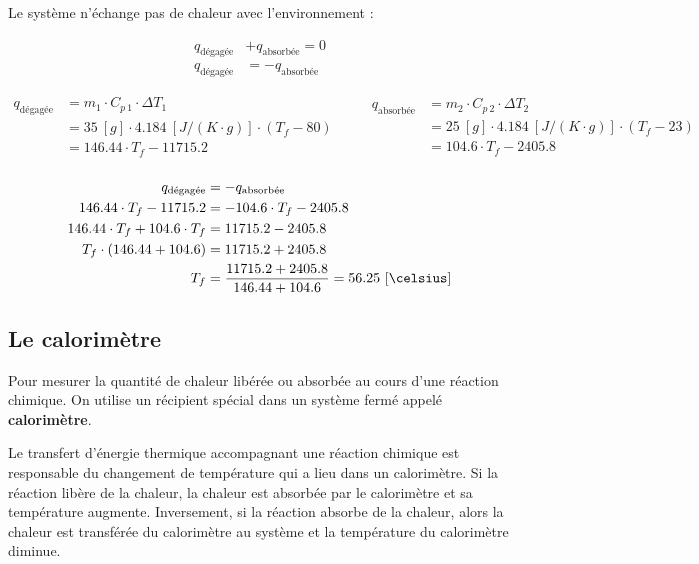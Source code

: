 \documentclass[
  11pt,
  a4paper,
  openany]{book}
\begin{document}
\begin{Answer}
Le système n'échange pas de chaleur avec l'environnement :

\[
\begin{split}
q_{\text{dégagée}} &+ q_{\text{absorbée}} = 0 \\
q_{\text{dégagée}} &= - q_{\text{absorbée}}
\end{split}
\]

\[
\begin{split}
q_{\text{dégagée}} &= m_1 \cdot C_{p\ 1} \cdot \Delta T_1 \\
  &= 35\ [g] \cdot 4.184\ [J/(K \cdot g)] \cdot (T_f - 80) \\
  &= 146.44 \cdot T_f - 11715.2 \\
\end{split}
\qquad
\begin{split}
q_{\text{absorbée}} &= m_2 \cdot C_{p\ 2} \cdot \Delta T_2 \\
  &= 25\ [g] \cdot 4.184\ [J/(K \cdot g)] \cdot (T_f - 23) \\
  &= 104.6 \cdot T_f - 2405.8 \\
\end{split}
\]

\[
\begin{split}
q_{\text{dégagée}} &= - q_{\text{absorbée}} \\
146.44 \cdot T_f - 11715.2 &= - 104.6 \cdot T_f - 2405.8 \\
146.44 \cdot T_f + 104.6 \cdot T_f &= 11715.2 - 2405.8 \\
T_f \cdot (146.44 + 104.6) &= 11715.2 + 2405.8 \\
T_f &= \frac{11715.2 + 2405.8}{146.44+104.6} = 56.25\ [\celsius]
\end{split}
\]

\end{Answer}

\hypertarget{le-calorimuxe8tre}{%
\subsection{Le calorimètre}\label{le-calorimuxe8tre}}

Pour mesurer la quantité de chaleur libérée ou absorbée au cours d'une réaction chimique. On utilise un récipient spécial dans un système fermé appelé \textbf{calorimètre}.

Le transfert d'énergie thermique accompagnant une réaction chimique est responsable du changement de température qui a lieu dans un calorimètre. Si la réaction libère de la chaleur, la chaleur est absorbée par le calorimètre et sa température augmente. Inversement, si la réaction absorbe de la chaleur, alors la chaleur est transférée du calorimètre au système et la température du calorimètre diminue.
\end{document}
